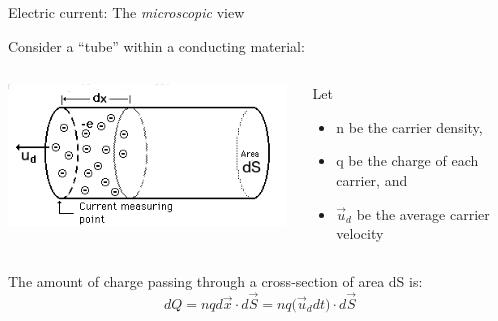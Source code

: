 %
%
%

\begin{frame}{Electric current: The {\em microscopic} view }

Consider a ``tube'' within a conducting material:\\
\vspace{0.2cm}

\begin{columns}
  \begin{column}{0.67\textwidth}
    \includegraphics[width=0.98\textwidth]{./images/schematics/current_microscopic_view.png}
  \end{column}
  \begin{column}{0.33\textwidth}
      Let
      \begin{itemize}
           \item n be the carrier density,
           \item q be the charge of each carrier, and
           \item $\vec{u}_{d}$ be the average carrier velocity
      \end{itemize}
  \end{column}
\end{columns}

\vspace{0.4cm}

The amount of charge passing through a cross-section of area dS is:
\begin{equation*}
  dQ = n q d\vec{x} \cdot d\vec{S}
        = n q \Big( \vec{u}_{d} dt \Big) \cdot d\vec{S}
\end{equation*}

\end{frame}


%
%
%

